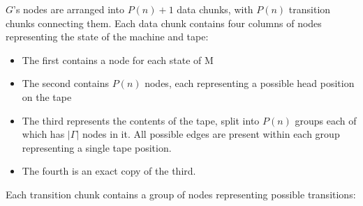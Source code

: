 \documentclass[12pt]{article}
\begin{document}
$G$'s nodes are arranged into $P(n)+1$ data chunks, with $P(n)$ transition chunks connecting them.
Each data chunk contains four columns of nodes representing the state of the machine and tape:
\begin{itemize}
  \item The first contains a node for each state of M
  \item The second contains $P(n)$ nodes, each representing a possible head position on the tape
  \item The third represents the contents of the tape, split into $P(n)$ groups each of which has $|\Gamma|$ nodes in it. All possible edges are present within each group representing a single tape position.
  \item The fourth is an exact copy of the third.
\end{itemize}
Each transition chunk contains a group of nodes representing possible transitions:
\end{document}
